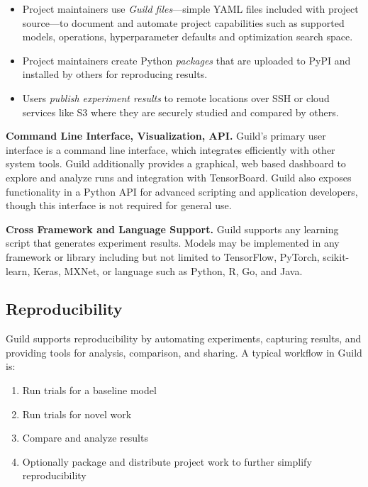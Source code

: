 \documentclass{article}
\begin{document}
\begin{itemize}[topsep=0pt, itemsep=0pt]
\item Project maintainers use \emph{Guild files}---simple YAML files
  included with project source---to document and automate project
  capabilities such as supported models, operations, hyperparameter
  defaults and optimization search space.

\item Project maintainers create Python \emph{packages} that are
  uploaded to PyPI and installed by others for reproducing results.

\item Users \emph{publish experiment results} to remote locations over
  SSH or cloud services like S3 where they are securely studied and
  compared by others.
\end{itemize}

\textbf{Command Line Interface, Visualization, API.} Guild's primary
user interface is a command line interface, which integrates
efficiently with other system tools. Guild additionally provides a
graphical, web based dashboard to explore and analyze runs and
integration with TensorBoard. Guild also exposes functionality in a
Python API for advanced scripting and application developers, though
this interface is not required for general use.

\textbf{Cross Framework and Language Support.} Guild supports any
learning script that generates experiment results. Models may be
implemented in any framework or library including but not limited to
TensorFlow, PyTorch, scikit-learn, Keras, MXNet, or language such as
Python, R, Go, and Java.

\subsection{Reproducibility}

Guild supports reproducibility by automating experiments, capturing
results, and providing tools for analysis, comparison, and sharing. A
typical workflow in Guild is:

\begin{enumerate}[noitemsep, topsep=0pt, partopsep=0pt]
\item Run trials for a baseline model
\item Run trials for novel work
\item Compare and analyze results
\item Optionally package and distribute project work to further
  simplify reproducibility
\end{enumerate}
\end{document}
